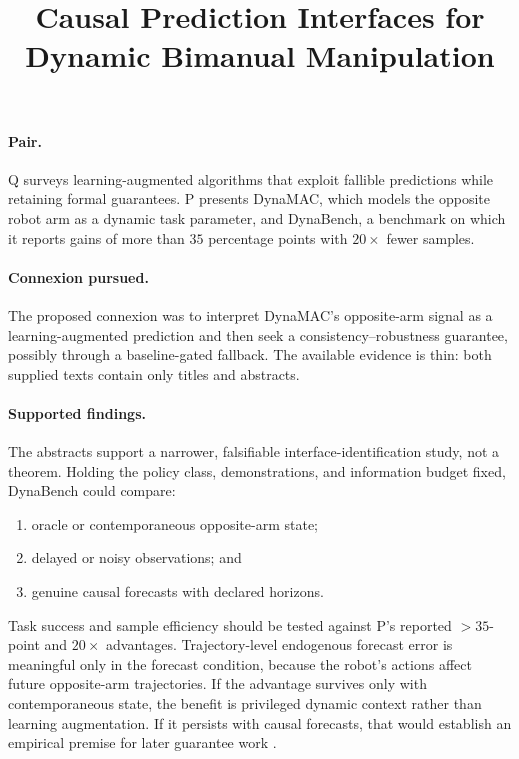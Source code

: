 \documentclass{article}
\title{Causal Prediction Interfaces for Dynamic Bimanual Manipulation}
\begin{document}
\maketitle

\paragraph{Pair.}
Q surveys learning-augmented algorithms that exploit fallible predictions while retaining formal guarantees. P presents DynaMAC, which models the opposite robot arm as a dynamic task parameter, and DynaBench, a benchmark on which it reports gains of more than \(35\) percentage points with \(20\times\) fewer samples.

\paragraph{Connexion pursued.}
The proposed connexion was to interpret DynaMAC's opposite-arm signal as a learning-augmented prediction and then seek a consistency--robustness guarantee, possibly through a baseline-gated fallback. The available evidence is thin: both supplied texts contain only titles and abstracts.

\paragraph{Supported findings.}
The abstracts support a narrower, falsifiable interface-identification study, not a theorem. Holding the policy class, demonstrations, and information budget fixed, DynaBench could compare:
\begin{enumerate}
    \item oracle or contemporaneous opposite-arm state;
    \item delayed or noisy observations; and
    \item genuine causal forecasts with declared horizons.
\end{enumerate}
Task success and sample efficiency should be tested against P's reported \(>35\)-point and \(20\times\) advantages. Trajectory-level endogenous forecast error is meaningful only in the forecast condition, because the robot's actions affect future opposite-arm trajectories. If the advantage survives only with contemporaneous state, the benefit is privileged dynamic context rather than learning augmentation. If it persists with causal forecasts, that would establish an empirical premise for later guarantee work .
\end{document}
